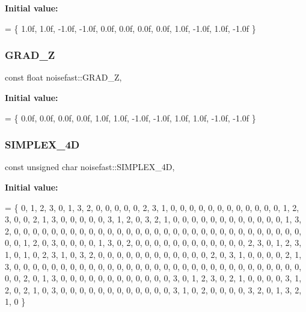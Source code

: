 {\bfseries Initial value\+:}
\begin{DoxyCode}
=
\{
    1.0f, 1.0f, -1.0f, -1.0f,
    0.0f, 0.0f, 0.0f, 0.0f,
    1.0f, -1.0f, 1.0f, -1.0f
\}
\end{DoxyCode}
\mbox{\label{classnoisefast_a42662d31cdcfc1a00be43b0fe648f225}} 
\subsubsection{\texorpdfstring{G\+R\+A\+D\+\_\+Z}{GRAD\_Z}}
{\footnotesize\ttfamily const float noisefast\+::\+G\+R\+A\+D\+\_\+Z\hspace{0.3cm}{\ttfamily [static]}, {\ttfamily [private]}}

{\bfseries Initial value\+:}
\begin{DoxyCode}
=
\{
    0.0f, 0.0f, 0.0f, 0.0f,
    1.0f, 1.0f, -1.0f, -1.0f,
    1.0f, 1.0f, -1.0f, -1.0f
\}
\end{DoxyCode}
\mbox{\label{classnoisefast_a138058eb09f55ef1cde3af03d5f2c9f3}} 
\subsubsection{\texorpdfstring{S\+I\+M\+P\+L\+E\+X\+\_\+4D}{SIMPLEX\_4D}}
{\footnotesize\ttfamily const unsigned char noisefast\+::\+S\+I\+M\+P\+L\+E\+X\+\_\+4D\hspace{0.3cm}{\ttfamily [static]}, {\ttfamily [private]}}

{\bfseries Initial value\+:}
\begin{DoxyCode}
=
\{
    0, 1, 2, 3, 0, 1, 3, 2, 0, 0, 0, 0, 0, 2, 3, 1, 0, 0, 0, 0, 0, 0, 0, 0, 0, 0, 0, 0, 1, 2, 3, 0,
    0, 2, 1, 3, 0, 0, 0, 0, 0, 3, 1, 2, 0, 3, 2, 1, 0, 0, 0, 0, 0, 0, 0, 0, 0, 0, 0, 0, 1, 3, 2, 0,
    0, 0, 0, 0, 0, 0, 0, 0, 0, 0, 0, 0, 0, 0, 0, 0, 0, 0, 0, 0, 0, 0, 0, 0, 0, 0, 0, 0, 0, 0, 0, 0,
    1, 2, 0, 3, 0, 0, 0, 0, 1, 3, 0, 2, 0, 0, 0, 0, 0, 0, 0, 0, 0, 0, 0, 0, 2, 3, 0, 1, 2, 3, 1, 0,
    1, 0, 2, 3, 1, 0, 3, 2, 0, 0, 0, 0, 0, 0, 0, 0, 0, 0, 0, 0, 2, 0, 3, 1, 0, 0, 0, 0, 2, 1, 3, 0,
    0, 0, 0, 0, 0, 0, 0, 0, 0, 0, 0, 0, 0, 0, 0, 0, 0, 0, 0, 0, 0, 0, 0, 0, 0, 0, 0, 0, 0, 0, 0, 0,
    2, 0, 1, 3, 0, 0, 0, 0, 0, 0, 0, 0, 0, 0, 0, 0, 3, 0, 1, 2, 3, 0, 2, 1, 0, 0, 0, 0, 3, 1, 2, 0,
    2, 1, 0, 3, 0, 0, 0, 0, 0, 0, 0, 0, 0, 0, 0, 0, 3, 1, 0, 2, 0, 0, 0, 0, 3, 2, 0, 1, 3, 2, 1, 0
\}
\end{DoxyCode}
\mbox{\label{classnoisefast_ad7aa689c36153418797dab461c4769f6}} 
